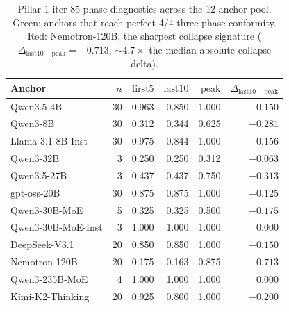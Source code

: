 \begin{table}[ht]
\centering
\small
\begin{tabular}{lrrrrr}
\hline
Anchor & $n$ & $\mathrm{first5}$ & $\mathrm{last10}$ &
$\mathrm{peak}$ & $\Delta_{\mathrm{last10}-\mathrm{peak}}$ \\
\hline
\rowcolor{green!10}
Qwen3.5-4B & 30 & 0.963 & 0.850 & 1.000 & $-0.150$ \\
\rowcolor{green!10}
Qwen3-8B & 30 & 0.312 & 0.344 & 0.625 & $-0.281$ \\
\rowcolor{green!10}
Llama-3.1-8B-Inst & 30 & 0.975 & 0.844 & 1.000 & $-0.156$ \\
Qwen3-32B & 3 & 0.250 & 0.250 & 0.312 & $-0.063$ \\
Qwen3.5-27B & 3 & 0.437 & 0.437 & 0.750 & $-0.313$ \\
gpt-oss-20B & 30 & 0.875 & 0.875 & 1.000 & $-0.125$ \\
Qwen3-30B-MoE & 5 & 0.325 & 0.325 & 0.500 & $-0.175$ \\
Qwen3-30B-MoE-Inst & 3 & 1.000 & 1.000 & 1.000 & $0.000$ \\
DeepSeek-V3.1 & 20 & 0.850 & 0.850 & 1.000 & $-0.150$ \\
\rowcolor{red!30}
Nemotron-120B & 20 & 0.175 & 0.163 & 0.875 & $\mathbf{-0.713}$ \\
Qwen3-235B-MoE & 4 & 1.000 & 1.000 & 1.000 & $0.000$ \\
Kimi-K2-Thinking & 20 & 0.925 & 0.800 & 1.000 & $-0.200$ \\
\hline
\end{tabular}
\caption{Pillar-1 iter-85 phase diagnostics across the 12-anchor pool.
Green: anchors that reach perfect 4/4 three-phase conformity.
Red: Nemotron-120B, the sharpest collapse signature
($\Delta_{\mathrm{last10}-\mathrm{peak}} = -0.713$, $\sim 4.7\times$
the median absolute collapse delta).}
\label{tab:iter85-phases}
\end{table}

